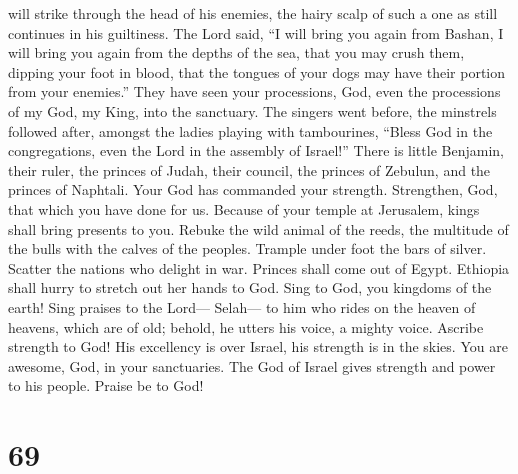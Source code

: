 will strike through the head of his enemies, the hairy scalp of such a
one as still continues in his guiltiness.  The Lord said,
``I will bring you again from Bashan, I will bring you again from the
depths of the sea,  that you may crush them, dipping your
foot in blood, that the tongues of your dogs may have their portion from
your enemies.''  They have seen your processions, God, even
the processions of my God, my King, into the sanctuary. 
The singers went before, the minstrels followed after, amongst the
ladies playing with tambourines,  ``Bless God in the
congregations, even the Lord in the assembly of Israel!'' 
There is little Benjamin, their ruler, the princes of Judah, their
council, the princes of Zebulun, and the princes of Naphtali.
 Your God has commanded your strength. Strengthen, God,
that which you have done for us.  Because of your temple at
Jerusalem, kings shall bring presents to you.  Rebuke the
wild animal of the reeds, the multitude of the bulls with the calves of
the peoples. Trample under foot the bars of silver. Scatter the nations
who delight in war.  Princes shall come out of Egypt.
Ethiopia shall hurry to stretch out her hands to God.  Sing
to God, you kingdoms of the earth! Sing praises to the Lord--- Selah---
 to him who rides on the heaven of heavens, which are of
old; behold, he utters his voice, a mighty voice.  Ascribe
strength to God! His excellency is over Israel, his strength is in the
skies.  You are awesome, God, in your sanctuaries. The God
of Israel gives strength and power to his people. Praise be to God!

\hypertarget{section-68}{%
\section{69}\label{section-68}}

